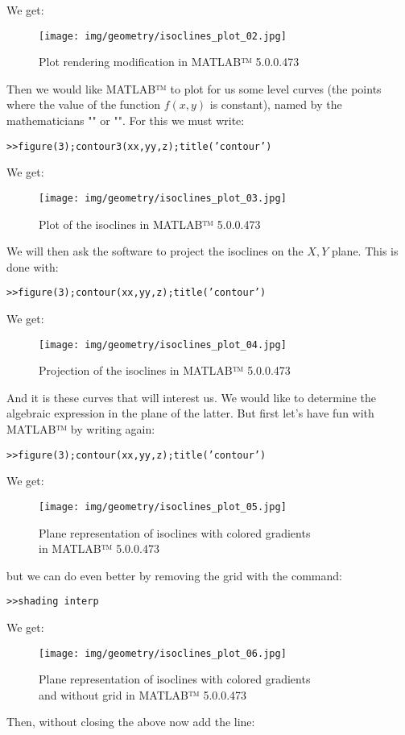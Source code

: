{	We get:
	\begin{figure}[H]
		\centering
		\texttt{[image: img/geometry/isoclines\_plot\_02.jpg]}
		\caption[]{Plot rendering modification in MATLAB™ 5.0.0.473}
	\end{figure}
	
	Then we would like MATLAB™  to plot for us some level curves (the points where the value of the function $f (x, y)$ is constant), named by the mathematicians "" or "". For this we must write:
	
	\texttt{>>figure(3);contour3(xx,yy,z);title('contour')}
	
	We get:
	\begin{figure}[H]
		\centering
		\texttt{[image: img/geometry/isoclines\_plot\_03.jpg]}
		\caption{Plot of the isoclines in MATLAB™ 5.0.0.473}
	\end{figure}
	We will then ask the software to project the isoclines on the $X, Y$ plane. This is done with:
	
	\texttt{>>figure(3);contour(xx,yy,z);title('contour')}
	
	We get:
	\begin{figure}[H]
		\centering
		\texttt{[image: img/geometry/isoclines\_plot\_04.jpg]}
		\caption{Projection of the isoclines in MATLAB™ 5.0.0.473}
	\end{figure}
	And it is these curves that will interest us. We would like to determine the algebraic expression in the plane of the latter. But first let's have fun with MATLAB™  by writing again:
	
	\texttt{>>figure(3);contour(xx,yy,z);title('contour')}
	
	We get:
	\begin{figure}[H]
		\centering
		\texttt{[image: img/geometry/isoclines\_plot\_05.jpg]}
		\caption{Plane representation of isoclines with colored gradients \\in MATLAB™ 5.0.0.473}
	\end{figure}
	
	but we can do even better by removing the grid with the command:
	
	\texttt{>>shading interp}
	
	We get:
	\begin{figure}[H]
		\centering
		\texttt{[image: img/geometry/isoclines\_plot\_06.jpg]}
		\caption[]{Plane representation of isoclines with colored gradients \\and without grid in MATLAB™ 5.0.0.473}
	\end{figure}
	Then, without closing the above now add the line:
	
}
